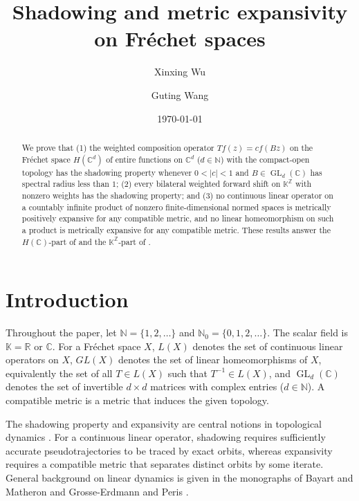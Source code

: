 \documentclass[11pt]{amsart}
\title{Shadowing and metric expansivity on Fr\'echet spaces}
\author{Xinxing Wu}
\author{Guting Wang}
\date{\today}
\theoremstyle{definition}
\theoremstyle{remark}
\theoremstyle{plain}
\begin{document}
\maketitle

\begin{abstract}
We prove that (1) the weighted composition operator \(Tf(z)=c f(Bz)\)
on the Fr\'echet space \(H(\mathbb{C}^d)\) of entire functions
on \(\mathbb{C}^d\) (\(d\in\mathbb{N}\)) with the compact-open topology
has the shadowing
property whenever \(0<|c|<1\) and \(B\in\operatorname{GL}_d(\mathbb C)\)
has spectral radius less than \(1\); (2) every bilateral weighted forward shift
on \(\mathbb K^{\mathbb Z}\) with nonzero weights has the shadowing property;
and (3) no continuous linear operator on a countably infinite product of
nonzero finite-dimensional normed spaces is
metrically positively expansive for any compatible metric, and no
linear homeomorphism on such a product is metrically expansive for any
compatible metric.
These results answer the \(H(\mathbb C)\)-part of \cite[Problem A]{BCDFP}
and the \(\mathbb K^{\mathbb Z}\)-part of \cite[Problem B]{BCDFP}.
\end{abstract}

\section{Introduction}


Throughout the paper, let \(\mathbb{N}=\{1,2,\ldots\}\) and
\(\mathbb{N}_0=\{0,1,2,\ldots\}.\) The scalar field is
\(\mathbb{K}=\mathbb{R}\) or \(\mathbb C\). For a Fr\'echet space
\(X\), \(L(X)\) denotes the set of continuous linear operators
on \(X\), \(GL(X)\) denotes the set of linear homeomorphisms of \(X\),
equivalently the set of all \(T\in L(X)\) such that \(T^{-1}\in L(X)\),
and \(\operatorname{GL}_d(\mathbb{C})\) denotes the set of invertible
\(d\times d\) matrices with complex entries ($d\in\mathbb{N}$).
A compatible metric is a metric that induces the given
topology.

The shadowing property and expansivity are central notions in topological
dynamics \cite{AokiHiraide,Pilyugin,Walters}.  For a continuous linear
operator, shadowing requires sufficiently accurate pseudotrajectories to be
traced by exact orbits, whereas expansivity requires a compatible metric that
separates distinct orbits by some iterate.  General background on linear
dynamics is given in the monographs of Bayart and Matheron
\cite{BayartMatheron} and Grosse-Erdmann and Peris
\cite{GrosseErdmannPeris}.
\end{document}
